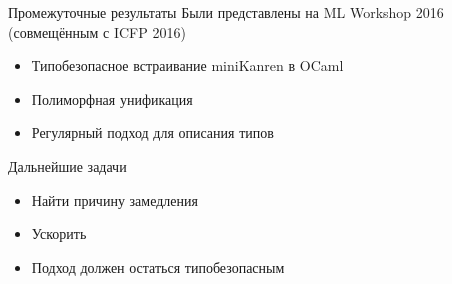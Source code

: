 \documentclass[10pt, mathserif]{beamer}
\let\\\tabularnewline
\let\\\tabularnewline
\newcommand{\oo}[1]{{#1}^o}
\newcommand{\graybox}[1]{\colorbox{light-gray}{#1}}
\theoremstyle{definition}
\begin{document}
%
%
%
%
%

\begin{frame}[fragile]{Промежуточные результаты}
Были представлены на ML Workshop 2016 (совмещённым с ICFP 2016)
\begin{itemize}
\item Типобезопасное встраивание miniKanren в OCaml
\item Полиморфная унификация
\item Регулярный подход для описания типов
\end{itemize}

\end{frame}

{

}

\begin{frame}[fragile]{Дальнейшие задачи}
  \begin{itemize}
  \item Найти причину замедления
  \item Ускорить
  \item Подход должен остаться типобезопасным
  \end{itemize}

\end{frame}
\end{document}
